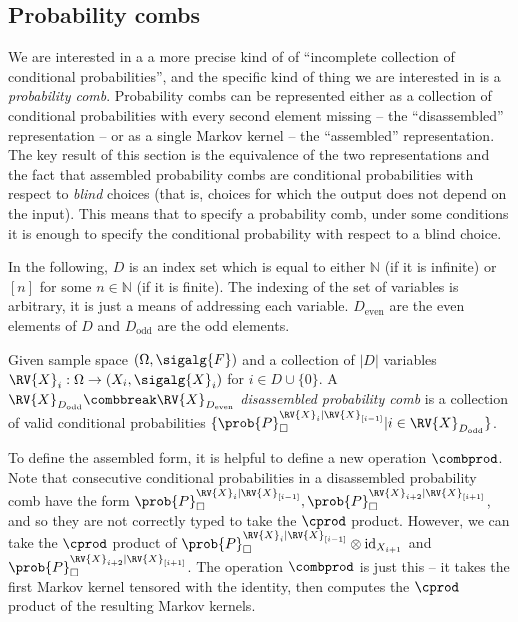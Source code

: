 \subsection{Probability combs}

We are interested in a a more precise kind of of ``incomplete collection of conditional probabilities'', and the specific kind of thing we are interested in is a \emph{probability comb}. Probability combs can be represented either as a collection of conditional probabilities with every second element missing -- the ``disassembled'' representation -- or as a single Markov kernel -- the ``assembled'' representation. The key result of this section is the equivalence of the two representations and the fact that assembled probability combs are conditional probabilities with respect to \emph{blind} choices (that is, choices for which the output does not depend on the input). This means that to specify a probability comb, under some conditions it is enough to specify the conditional probability with respect to a blind choice.

In the following, $D$ is an index set which is equal to either $\mathbb{N}$ (if it is infinite) or $[n]$ for some $n\in \mathbb{N}$ (if it is finite). The indexing of the set of variables is arbitrary, it is just a means of addressing each variable. $D_{\text{even}}$ are the even elements of $D$ and $D_{\text{odd}}$ are the odd elements.

\begin{definition}
Given sample space $(\Omega,\sigalg{F})$ and a collection of $|D|$ variables $\RV{X}_{i}:\Omega\to (X_i,\sigalg{X}_i)$ for $i\in D\cup\{0\}$. A $\RV{X}_{D_{\text{odd}}}\combbreak \RV{X}_{D_{\text{even}}}$ \emph{disassembled probability comb} is a collection of valid conditional probabilities $\{\prob{P}_\square^{\RV{X}_{i}|\RV{X}_{[i-1]}}|i\in \RV{X}_{D_{\text{odd}}}\}$.
\end{definition}

To define the assembled form, it is helpful to define a new operation $\combprod$. Note that consecutive conditional probabilities in a disassembled probability comb have the form $\prob{P}_\square^{\RV{X}_i|\RV{X}_{[i-1]}},\prob{P}_\square^{\RV{X}_{i+2}|\RV{X}_{[i+1]}}$, and so they are not correctly typed to take the $\cprod$ product. However, we can take the $\cprod$ product of $\prob{P}_\square^{\RV{X}_i|\RV{X}_{[i-1]}}\otimes\mathrm{id}_{X_{i+1}}$ and $\prob{P}_\square^{\RV{X}_{i+2}|\RV{X}_{[i+1]}}$. The operation $\combprod$ is just this -- it takes the first Markov kernel tensored with the identity, then computes the $\cprod$ product of the resulting Markov kernels.

